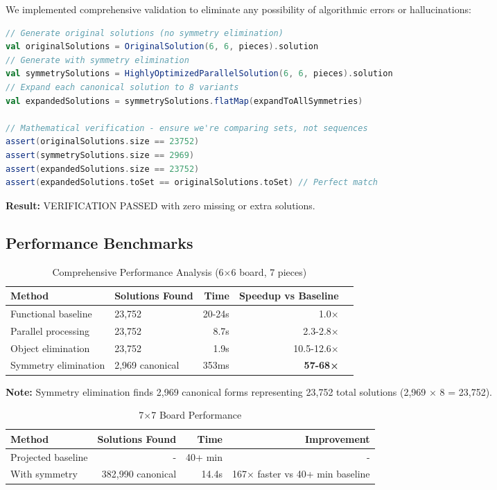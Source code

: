 \documentclass[12pt,a4paper]{article}
\theoremstyle{definition}
\begin{document}
We implemented comprehensive validation to eliminate any possibility of algorithmic errors or hallucinations:

\begin{lstlisting}[language=Scala, caption=Symmetry Verification Test]
// Generate original solutions (no symmetry elimination)
val originalSolutions = OriginalSolution(6, 6, pieces).solution
// Generate with symmetry elimination  
val symmetrySolutions = HighlyOptimizedParallelSolution(6, 6, pieces).solution
// Expand each canonical solution to 8 variants
val expandedSolutions = symmetrySolutions.flatMap(expandToAllSymmetries)

// Mathematical verification - ensure we're comparing sets, not sequences
assert(originalSolutions.size == 23752)
assert(symmetrySolutions.size == 2969) 
assert(expandedSolutions.size == 23752)
assert(expandedSolutions.toSet == originalSolutions.toSet) // Perfect match
\end{lstlisting}

\textbf{Result:} VERIFICATION PASSED with zero missing or extra solutions.

\subsection{Performance Benchmarks}

\begin{table}[h]
\centering
\caption{Comprehensive Performance Analysis (6$\times$6 board, 7 pieces)}
\begin{tabular}{@{}llrrr@{}}
\toprule
Method & Solutions Found & Time & Speedup vs Baseline \\
\midrule
Functional baseline & 23,752 & 20-24s & 1.0× \\
Parallel processing & 23,752 & 8.7s & 2.3-2.8× \\
Object elimination & 23,752 & 1.9s & 10.5-12.6× \\
Symmetry elimination & 2,969 canonical & 353ms & \textbf{57-68×} \\
\bottomrule
\end{tabular}
\end{table}

\textbf{Note:} Symmetry elimination finds 2,969 canonical forms representing 23,752 total solutions (2,969 × 8 = 23,752).

\begin{table}[h]
\centering
\caption{7$\times$7 Board Performance}
\begin{tabular}{@{}lrrr@{}}
\toprule
Method & Solutions Found & Time & Improvement \\
\midrule
Projected baseline & - & 40+ min & - \\
With symmetry & 382,990 canonical & 14.4s & 167× faster vs 40+ min baseline \\
\bottomrule
\end{tabular}
\end{table}
\end{document}

